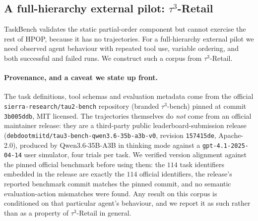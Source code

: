 %

\subsection{A full-hierarchy external pilot: $\tau^3$-Retail}
\label{sec:tau3-setup}

TaskBench validates the static partial-order component but cannot exercise the
rest of HPOP, because it has no trajectories. For a full-hierarchy external
pilot we need observed agent behaviour with repeated tool use, variable
ordering, and both successful and failed runs. We construct such a corpus from
$\tau^3$-Retail.

\paragraph{Provenance, and a caveat we state up front.}
The task definitions, tool schemas and evaluation metadata come from the
official \texttt{sierra-research/tau2-bench} repository (branded $\tau^3$-bench)
pinned at commit \texttt{3b005ddb}, MIT licensed. The trajectories themselves do
\emph{not} come from an official maintainer release: they are a third-party
public leaderboard-submission release
(\texttt{debdootmiitd/tau3-bench-qwen3.6-35b-a3b-v0}, revision
\texttt{157415de}, Apache-2.0), produced by Qwen3.6-35B-A3B in thinking mode
against a \texttt{gpt-4.1-2025-04-14} user simulator, four trials per task. We
verified version alignment against the pinned official benchmark before using
them: the $114$ task identifiers embedded in the release are exactly the $114$
official identifiers, the release's reported benchmark commit matches the pinned
commit, and no semantic evaluation-action mismatches were found. Any result on
this corpus is conditioned on that particular agent's behaviour, and we report
it as such rather than as a property of $\tau^3$-Retail in general.


